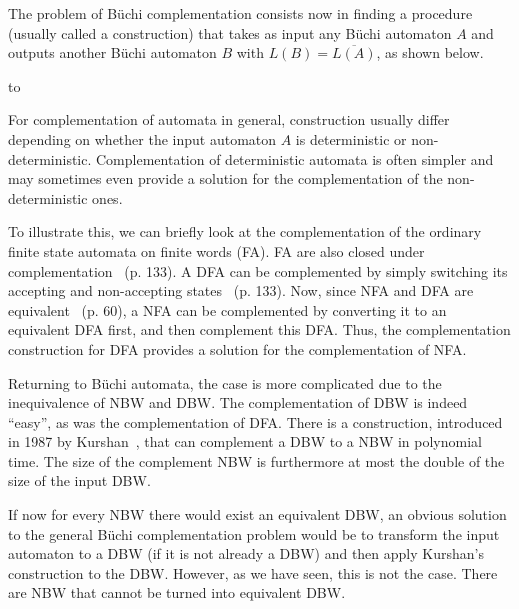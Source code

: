 \documentclass{scrreprt}
\begin{document}
The problem of Büchi complementation consists now in finding a procedure (usually called a construction) that takes as input any Büchi automaton $A$ and outputs another Büchi automaton $B$ with $L(B) = \overline{L(A)}$, as shown below.

\hbox to 

For complementation of automata in general, construction usually differ depending on whether the input automaton $A$ is deterministic or non-deterministic. Complementation of deterministic automata is often simpler and may sometimes even provide a solution for the complementation of the non-deterministic ones.

To illustrate this, we can briefly look at the complementation of the ordinary finite state automata on finite words (FA). FA are also closed under complementation~\cite{hopcroft2006automata} (p. 133). A DFA can be complemented by simply switching its accepting and non-accepting states~\cite{hopcroft2006automata} (p. 133). Now, since NFA and DFA are equivalent~\cite{hopcroft2006automata} (p. 60), a NFA can be complemented by converting it to an equivalent DFA first, and then complement this DFA. Thus, the complementation construction for DFA provides a solution for the complementation of NFA.

Returning to Büchi automata, the case is more complicated due to the inequivalence of NBW and DBW. The complementation of DBW is indeed ``easy'', as was the complementation of DFA. There is a construction, introduced in 1987 by Kurshan~\cite{Kurshan198759}, that can complement a DBW to a NBW in polynomial time. The size of the complement NBW is furthermore at most the double of the size of the input DBW.

If now for every NBW there would exist an equivalent DBW, an obvious solution to the general Büchi complementation problem would be to transform the input automaton to a DBW (if it is not already a DBW) and then apply Kurshan's construction to the DBW. However, as we have seen, this is not the case. There are NBW that cannot be turned into equivalent DBW.
\end{document}
